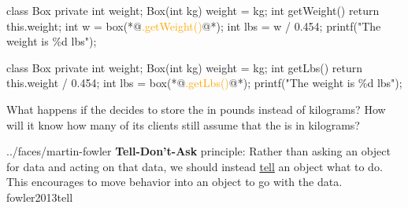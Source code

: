 \documentclass{article}
\begin{document}
\begin{pptWide}{2}
{\small\begin{ffcode}
class Box {
  private int weight;
  Box(int kg) { weight = kg; }
  int getWeight() {
    return this.weight;
  }
}
int w = box(*@\textcolor{orange}{.getWeight()}@*);
int lbs = w / 0.454;
printf("The weight is \%d lbs\n");
\end{ffcode}
}
\par\columnbreak\par
{\small\begin{ffcode}
class Box {
  private int weight;
  Box(int kg) { weight = kg; }
  int getLbs() {
    return this.weight / 0.454;
  }
}
int lbs = box(*@\textcolor{orange}{.getLbs()}@*);
printf("The weight is \%d lbs\n");
\end{ffcode}
}
\end{pptWide}
\par
What happens if the  decides to store the  in pounds instead of kilograms? How will it know how many of its clients still assume that the  is in kilograms?~\citep{bugayenko2014blog0916}
\plush{}


\lnQuote
  {../faces/martin-fowler}
  {\textbf{Tell-Don't-Ask} principle: Rather than asking an object for data and acting on that data, we should instead \ul{tell} an object what to do. This encourages to move behavior into an object to go with the data.}
  {fowler2013tell}
\end{document}
